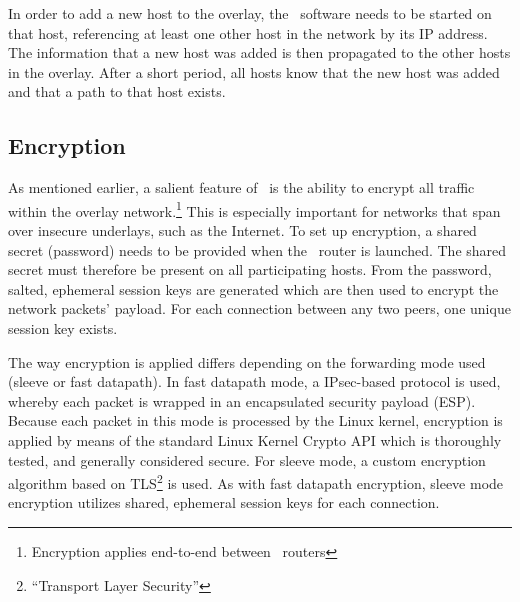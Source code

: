 In order to add a new host to the overlay, the \weave\ software needs to be started on that host, referencing at least one other host in the network by its IP address. The information that a new host was added is then propagated to the other hosts in the overlay. After a short period, all hosts know that the new host was added and that a path to that host exists.

\subsection{Encryption}
As mentioned earlier, a salient feature of \wnet\ is the ability to encrypt all traffic within the overlay network.\footnote{Encryption applies end-to-end between \weave\ routers} This is especially important for networks that span over insecure underlays, such as the Internet. To set up encryption, a shared secret (password) needs to be provided when the \weave\ router is launched. The shared secret must therefore be present on all participating hosts. From the password, salted, ephemeral session keys are generated which are then used to encrypt the network packets' payload. For each connection between any two peers, one unique session key exists.

The way encryption is applied differs depending on the forwarding mode used (sleeve or fast datapath). In fast datapath mode, a IPsec-based protocol is used, whereby each packet is wrapped in an encapsulated security payload (ESP). Because each packet in this mode is processed by the Linux kernel, encryption is applied by means of the standard Linux Kernel Crypto API which is thoroughly tested, and generally considered secure. For sleeve mode, a custom encryption algorithm based on TLS\footnote{``Transport Layer Security''} is used. As with fast datapath encryption, sleeve mode encryption utilizes shared, ephemeral session keys for each connection.

